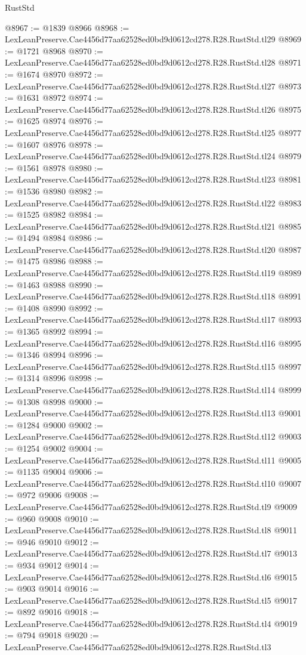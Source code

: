 \begin{lexlean}{RustStd}
\begin{coremodule}
@8967 := @1839 @8966
@8968 := LexLeanPreserve.Cae4456d77aa62528ed0bd9d0612cd278.R28.RustStd.tl29
@8969 := @1721 @8968
@8970 := LexLeanPreserve.Cae4456d77aa62528ed0bd9d0612cd278.R28.RustStd.tl28
@8971 := @1674 @8970
@8972 := LexLeanPreserve.Cae4456d77aa62528ed0bd9d0612cd278.R28.RustStd.tl27
@8973 := @1631 @8972
@8974 := LexLeanPreserve.Cae4456d77aa62528ed0bd9d0612cd278.R28.RustStd.tl26
@8975 := @1625 @8974
@8976 := LexLeanPreserve.Cae4456d77aa62528ed0bd9d0612cd278.R28.RustStd.tl25
@8977 := @1607 @8976
@8978 := LexLeanPreserve.Cae4456d77aa62528ed0bd9d0612cd278.R28.RustStd.tl24
@8979 := @1561 @8978
@8980 := LexLeanPreserve.Cae4456d77aa62528ed0bd9d0612cd278.R28.RustStd.tl23
@8981 := @1536 @8980
@8982 := LexLeanPreserve.Cae4456d77aa62528ed0bd9d0612cd278.R28.RustStd.tl22
@8983 := @1525 @8982
@8984 := LexLeanPreserve.Cae4456d77aa62528ed0bd9d0612cd278.R28.RustStd.tl21
@8985 := @1494 @8984
@8986 := LexLeanPreserve.Cae4456d77aa62528ed0bd9d0612cd278.R28.RustStd.tl20
@8987 := @1475 @8986
@8988 := LexLeanPreserve.Cae4456d77aa62528ed0bd9d0612cd278.R28.RustStd.tl19
@8989 := @1463 @8988
@8990 := LexLeanPreserve.Cae4456d77aa62528ed0bd9d0612cd278.R28.RustStd.tl18
@8991 := @1408 @8990
@8992 := LexLeanPreserve.Cae4456d77aa62528ed0bd9d0612cd278.R28.RustStd.tl17
@8993 := @1365 @8992
@8994 := LexLeanPreserve.Cae4456d77aa62528ed0bd9d0612cd278.R28.RustStd.tl16
@8995 := @1346 @8994
@8996 := LexLeanPreserve.Cae4456d77aa62528ed0bd9d0612cd278.R28.RustStd.tl15
@8997 := @1314 @8996
@8998 := LexLeanPreserve.Cae4456d77aa62528ed0bd9d0612cd278.R28.RustStd.tl14
@8999 := @1308 @8998
@9000 := LexLeanPreserve.Cae4456d77aa62528ed0bd9d0612cd278.R28.RustStd.tl13
@9001 := @1284 @9000
@9002 := LexLeanPreserve.Cae4456d77aa62528ed0bd9d0612cd278.R28.RustStd.tl12
@9003 := @1254 @9002
@9004 := LexLeanPreserve.Cae4456d77aa62528ed0bd9d0612cd278.R28.RustStd.tl11
@9005 := @1135 @9004
@9006 := LexLeanPreserve.Cae4456d77aa62528ed0bd9d0612cd278.R28.RustStd.tl10
@9007 := @972 @9006
@9008 := LexLeanPreserve.Cae4456d77aa62528ed0bd9d0612cd278.R28.RustStd.tl9
@9009 := @960 @9008
@9010 := LexLeanPreserve.Cae4456d77aa62528ed0bd9d0612cd278.R28.RustStd.tl8
@9011 := @946 @9010
@9012 := LexLeanPreserve.Cae4456d77aa62528ed0bd9d0612cd278.R28.RustStd.tl7
@9013 := @934 @9012
@9014 := LexLeanPreserve.Cae4456d77aa62528ed0bd9d0612cd278.R28.RustStd.tl6
@9015 := @903 @9014
@9016 := LexLeanPreserve.Cae4456d77aa62528ed0bd9d0612cd278.R28.RustStd.tl5
@9017 := @892 @9016
@9018 := LexLeanPreserve.Cae4456d77aa62528ed0bd9d0612cd278.R28.RustStd.tl4
@9019 := @794 @9018
@9020 := LexLeanPreserve.Cae4456d77aa62528ed0bd9d0612cd278.R28.RustStd.tl3

\end{coremodule}
\end{lexlean}
